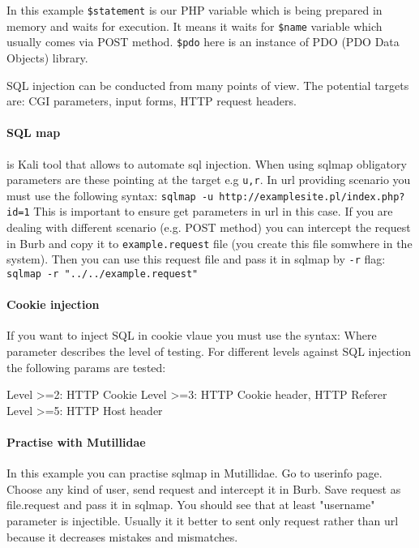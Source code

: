 In this example \texttt{\$statement} is our PHP variable  which is being prepared in memory and waits for execution.
It means it waits for \texttt{\$name} variable which usually comes via POST method. \texttt{\$pdo} here is an instance of PDO (PDO Data Objects) library.

SQL injection can be conducted from many points of view.
The potential targets are: CGI parameters, input forms, HTTP request headers.


\paragraph{SQL map} is Kali tool that allows to automate sql injection.
When using sqlmap obligatory parameters are these pointing at the target e.g \texttt{u,r}.
In url providing scenario you must use the following syntax: \texttt{sqlmap -u http://examplesite.pl/index.php?id=1}
\newline
This is important to ensure get parameters in url in this case.
If you are dealing with different scenario (e.g. POST method) you can intercept the request in Burb and copy it to \texttt{example.request} file (you create this file somwhere in the system).
Then you can use this request file and pass it in sqlmap by \texttt{-r} flag: \newline
\texttt{sqlmap -r "../../example.request"}
\paragraph{Cookie injection}
If you want to inject SQL in cookie vlaue you must use the syntax:
Where  parameter describes the level of testing.
For different levels against SQL injection the following params are tested:

Level >=2: HTTP Cookie
\newline
Level >=3: HTTP Cookie header, HTTP Referer
\newline
Level >=5: HTTP Host header
\newline
\paragraph{Practise with Mutillidae}
In this example you can practise sqlmap in Mutillidae.
Go to userinfo page.
Choose  any kind of user, send request and intercept it in Burb.
Save request as file.request and pass it in sqlmap.
You should see that at least "username" parameter is injectible.
Usually it it better to sent only request rather than url because it decreases mistakes and mismatches.

